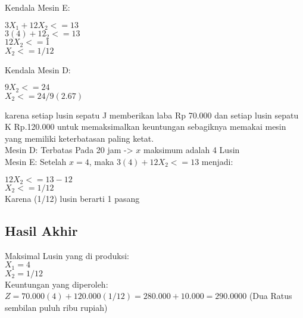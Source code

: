 \documentclass{article}
\begin{document}
Kendala Mesin E: 
 \begin{center}
$3X_1 + 12X_2 <= 13$ \\
$3(4) + 12_2 <= 13$ \\
$ 12X_2 <= 1$\\
$X_2 <= 1/12$ \\
 \end{center}
Kendala Mesin D: 
 \begin{center}
   $ 9X_2 <= 24$\\
   $ X_2 <=24/9(2.67)$\\
 \end{center}
karena setiap lusin sepatu J memberikan laba Rp 70.000 dan setiap lusin sepatu K Rp.120.000 untuk memaksimalkan keuntungan sebagiknya memakai mesin yang memiliki keterbatasan paling ketat. \\
Mesin D: Terbatas Pada 20 jam -> $x$ maksimum adalah 4 Lusin \\
Mesin E: Setelah $x = 4$, maka $3(4) + 12X_2<= 13$ menjadi: \\
 \begin{center}
   $12X_2 <= 13-12$ \\
   $X_2 <= 1/12$\\ Karena (1/12) lusin berarti 1 pasang
 \end{center}
 \subsection*{Hasil Akhir} 
 Maksimal Lusin yang di produksi: \\
 $X_1 = 4$ \\
 $X_2 = 1/12$ \\
Keuntungan yang diperoleh: \\
$Z=70.000(4) + 120.000(1/12) = 280.000 + 10.000 = 290.0000$ (Dua Ratus sembilan puluh ribu rupiah)
\end{document}
